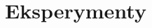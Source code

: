 \documentclass[preprint,12pt]{elsarticle}
\begin{document}
\section {Eksperymenty}














\end{document}
